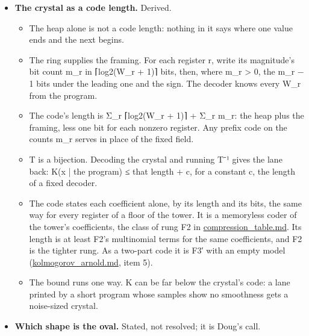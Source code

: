 \begin{itemize}
\begin{itemize}
\begin{itemize}
\item Narrowed: the ring equals the replica's column floor for floor, in a 130-limb file. The run has 1,955 steps; the replica's 11 more are its own constant 2s. The live bits peak at the last cut, 3,606.
\item Wrapped at the mirror: T⁻¹ 5 to T⁻¹ 1 equal the replica's column, in an 84-limb file of 2,081 steps. The run wrapped the samples to 17 bits, not 16, and its T⁻¹ 0 reads 1,088. The live bits peak at 1,546, at cut 1,023, against 1,010 at the crystal.
\item 128 samples at 7 levels: refused under the narrowing alone, its widest register 65 bits. Wrapped at the mirror, it loads in 164 limbs and 4,193 steps, with the ring 2,048 at the samples, 2,810 at the crystal and 2,176 at the rebuilt samples, and the round trip is exact on every lane.
\end{itemize}
\end{itemize}
\item \textbf{The crystal as a code length.} Derived.

\begin{itemize}
\item The heap alone is not a code length: nothing in it says where one value ends and the next begins.
\item The ring supplies the framing. For each register r, write its magnitude's bit count m\_\allowbreak{}r in ⌈log2(W\_\allowbreak{}r + 1)⌉ bits, then, where m\_\allowbreak{}r > 0, the m\_\allowbreak{}r − 1 bits under the leading one and the sign. The decoder knows every W\_\allowbreak{}r from the program.
\item The code's length is Σ\_\allowbreak{}r ⌈log2(W\_\allowbreak{}r + 1)⌉ + Σ\_\allowbreak{}r m\_\allowbreak{}r: the heap plus the framing, less one bit for each nonzero register. Any prefix code on the counts m\_\allowbreak{}r serves in place of the fixed field.
\item T is a bijection. Decoding the crystal and running T⁻¹ gives the lane back: K(x | the program) ≤ that length + c, for a constant c, the length of a fixed decoder.
\item The code states each coefficient alone, by its length and its bits, the same way for every register of a floor of the tower. It is a memoryless coder of the tower's coefficients, the class of rung F2 in \hyperref[chap:compression-table]{compression\_\allowbreak{}table.md}. Its length is at least F2's multinomial terms for the same coefficients, and F2 is the tighter rung. As a two-part code it is F3′ with an empty model (\hyperref[chap:kolmogorov-arnold]{kolmogorov\_\allowbreak{}arnold.md}, item 5).
\item The bound runs one way. K can be far below the crystal's code: a lane printed by a short program whose samples show no smoothness gets a noise-sized crystal.
\end{itemize}
\item \textbf{Which shape is the oval.} Stated, not resolved; it is Doug's call.


\end{itemize}
